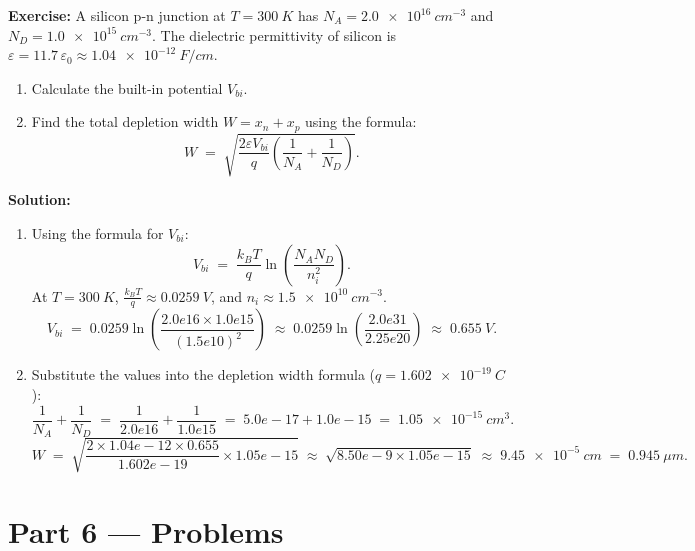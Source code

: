 \documentclass[12pt, a4paper]{book}
\begin{document}
\begin{problembox}
\textbf{Exercise:} A silicon p-n junction at $T = \SI{300}{K}$ has $N_A = \SI{2.0e16}{cm^{-3}}$ and $N_D = \SI{1.0e15}{cm^{-3}}$. The dielectric permittivity of silicon is $\varepsilon = 11.7\,\varepsilon_0 \approx \SI{1.04e-12}{F/cm}$.
\begin{enumerate}
  \item Calculate the built-in potential $V_{bi}$.
  \item Find the total depletion width $W = x_n + x_p$ using the formula:
        \[
          W \;=\; \sqrt{\frac{2\varepsilon V_{bi}}{q}\left(\frac{1}{N_A} + \frac{1}{N_D}\right)}.
        \]
\end{enumerate}

\textbf{Solution:}
\begin{enumerate}
  \item Using the formula for $V_{bi}$:
        \[
          V_{bi} \;=\; \frac{k_B T}{q} \ln\left(\frac{N_A N_D}{n_i^2}\right).
        \]
        At $T = \SI{300}{K}$, $\frac{k_B T}{q} \approx \SI{0.0259}{V}$, and $n_i \approx \SI{1.5e10}{cm^{-3}}$.
        \[
          V_{bi} \;=\; 0.0259 \ln\left(\frac{2.0e16 \times 1.0e15}{(1.5e10)^2}\right) \;\approx\; 0.0259 \ln\left(\frac{2.0e31}{2.25e20}\right) \;\approx\; \SI{0.655}{V}.
        \]
  \item Substitute the values into the depletion width formula ($q = \SI{1.602e-19}{C}$):
        \[
          \frac{1}{N_A} + \frac{1}{N_D} \;=\; \frac{1}{2.0e16} + \frac{1}{1.0e15} \;=\; 5.0e-17 + 1.0e-15 \;=\; \SI{1.05e-15}{cm^3}.
        \]
        \[
          W \;=\; \sqrt{\frac{2 \times 1.04e-12 \times 0.655}{1.602e-19} \times 1.05e-15} \;\approx\; \sqrt{8.50e-9 \times 1.05e-15} \;\approx\; \SI{9.45e-5}{cm} \;=\; \SI{0.945}{\mu m}.
        \]
\end{enumerate}
\end{problembox}

\newpage

\section{Part 6 --- Problems}
\end{document}
